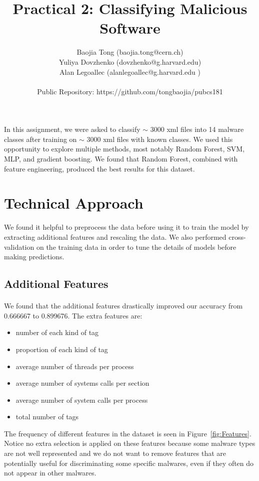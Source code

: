 \documentclass[11pt]{article}
\title{Practical 2: Classifying Malicious Software}
\author{ Baojia Tong (baojia.tong@cern.ch)\\Yuliya Dovzhenko (dovzhenko@g.harvard.edu)\\Alan Legoallec (alanlegoallec@g.harvard.edu )\\\\Public Repository: https://github.com/tongbaojia/pubcs181}
\begin{document}
\maketitle{}
\paragraph{} In this assignment, we were asked to classify $\sim$ 3000 xml files into 14 malware classes after training on $\sim$ 3000 xml files with known classes. We used this opportunity to explore multiple methods, most notably Random Forest, SVM, MLP, and gradient boosting. We found that Random Forest, combined with feature engineering, produced the best results for this dataset. 
\section{Technical Approach}
We found it helpful to preprocess the data before using it to train the model by extracting additional features and rescaling the data. We also performed cross-validation on the training data in order to tune the details of models before making predictions.
\subsection{Additional Features}
\paragraph{}
We found that the additional features drastically improved our accuracy from 0.666667 to 0.899676. 
The extra features are:       
\begin{itemize}  
\item number of each kind of tag
\item proportion of each kind of tag
\item average number of threads per process
\item average number of systems calls per section
\item average number of system calls per process
 \item total number of tags 
 \end{itemize}
The frequency of different features in the dataset is seen in Figure~\ref{fig:Features}. Notice no extra selection is applied on these features because some malware types are not well represented and we do not want to remove features that are potentially useful for discriminating some specific malwares, even if they often do not appear in other malwares.
\end{document}
